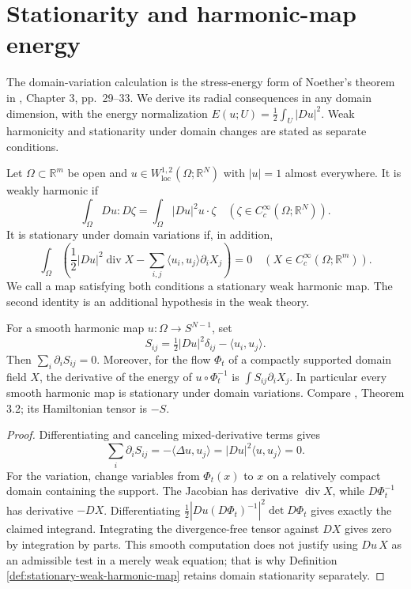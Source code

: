 \chapter{Stationarity and harmonic-map energy}\label{sec:harmonic-map-energy}
The domain-variation calculation is the stress-energy form of Noether's theorem in \cite{Hel01}, Chapter 3, pp.~29--33. We derive its radial consequences in any domain dimension, with the energy normalization $E(u;U)=\frac12\int_U|Du|^2$. Weak harmonicity and stationarity under domain changes are stated as separate conditions.

\begin{definition}\label{def:stationary-weak-harmonic-map}
Let $\Omega\subset\mathbb R^m$ be open and $u\in W^{1,2}_{\mathrm{loc}}(\Omega;\mathbb R^N)$ with $|u|=1$ almost everywhere. It is weakly harmonic if
\[
 \int_\Omega Du:D\zeta=\int_\Omega |Du|^2u\cdot\zeta
 \quad(\zeta\in C_c^\infty(\Omega;\mathbb R^N)).
\]
It is stationary under domain variations if, in addition,
\[
 \int_\Omega\left(\frac12|Du|^2\operatorname{div}X
       -\sum_{i,j}\langle u_i,u_j\rangle\partial_iX_j\right)=0
 \quad(X\in C_c^\infty(\Omega;\mathbb R^m)).
\]
We call a map satisfying both conditions a stationary weak harmonic map. The second identity is an additional hypothesis in the weak theory.
\end{definition}

\begin{proposition}\label{prop:harmonic-map-stress-tensor}
For a smooth harmonic map $u:\Omega\to S^{N-1}$, set
\[
 S_{ij}=\tfrac12|Du|^2\delta_{ij}-\langle u_i,u_j\rangle.
\]
Then $\sum_i\partial_iS_{ij}=0$. Moreover, for the flow $\Phi_t$ of a compactly supported domain field $X$, the derivative of the energy of $u\circ\Phi_t^{-1}$ is $\int S_{ij}\partial_iX_j$. In particular every smooth harmonic map is stationary under domain variations. Compare \cite{Hel01}, Theorem 3.2; its Hamiltonian tensor is $-S$.
\end{proposition}
\begin{proof}
Differentiating and canceling mixed-derivative terms gives
\[
 \sum_i\partial_iS_{ij}=-\langle\Delta u,u_j\rangle=|Du|^2\langle u,u_j\rangle=0.
\]
For the variation, change variables from $\Phi_t(x)$ to $x$ on a relatively compact domain containing the support. The Jacobian has derivative $\operatorname{div}X$, while $D\Phi_t^{-1}$ has derivative $-DX$. Differentiating $\frac12|Du(D\Phi_t)^{-1}|^2\det D\Phi_t$ gives exactly the claimed integrand. Integrating the divergence-free tensor against $DX$ gives zero by integration by parts. This smooth computation does not justify using $Du\,X$ as an admissible test in a merely weak equation; that is why Definition \ref{def:stationary-weak-harmonic-map} retains domain stationarity separately.
\end{proof}

